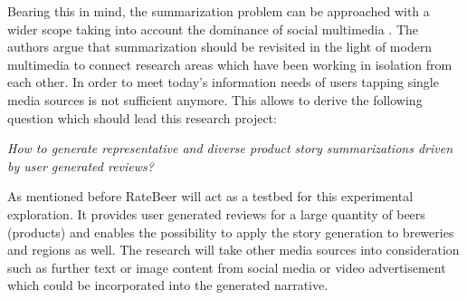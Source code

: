Bearing this in mind, the summarization problem can be approached with a wider scope taking into account the dominance of social multimedia \cite{B2018a}.
The authors argue that summarization should be revisited in the light of modern multimedia to connect research areas which have been working in isolation from each other.
In order to meet today's information needs of users tapping single media sources is not sufficient anymore.
This allows to derive the following question which should lead this research project:

\noindent
\emph{How to generate representative and diverse product story summarizations driven by user generated reviews?}

As mentioned before RateBeer will act as a testbed for this experimental exploration.
It provides user generated reviews for a large quantity of beers (products) and enables the possibility to apply the story generation to breweries and regions as well.
The research will take other media sources into consideration such as further text or image content from social media or video advertisement which could be incorporated into the generated narrative.